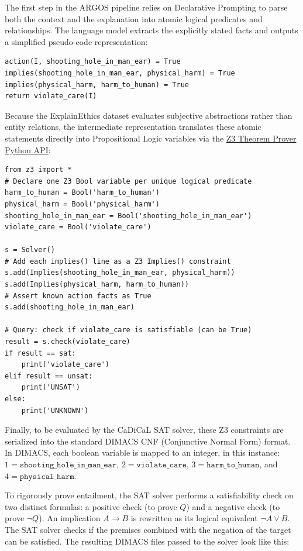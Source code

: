 The first step in the ARGOS pipeline relies on Declarative Prompting to parse both the context and the explanation into atomic logical predicates and relationships. The language model extracts the explicitly stated facts and outputs a simplified pseudo-code representation:

\begin{verbatim}
action(I, shooting_hole_in_man_ear) = True
implies(shooting_hole_in_man_ear, physical_harm) = True
implies(physical_harm, harm_to_human) = True
return violate_care(I)
\end{verbatim}

Because the ExplainEthics dataset evaluates subjective abstractions rather than entity relations, the intermediate representation translates these atomic statements directly into Propositional Logic variables via the \href{https://z3prover.github.io/api/html/namespacez3py.html}{Z3 Theorem Prover Python API}:

\begin{verbatim}
from z3 import *
# Declare one Z3 Bool variable per unique logical predicate
harm_to_human = Bool('harm_to_human')
physical_harm = Bool('physical_harm')
shooting_hole_in_man_ear = Bool('shooting_hole_in_man_ear')
violate_care = Bool('violate_care')

s = Solver()
# Add each implies() line as a Z3 Implies() constraint
s.add(Implies(shooting_hole_in_man_ear, physical_harm))
s.add(Implies(physical_harm, harm_to_human))
# Assert known action facts as True
s.add(shooting_hole_in_man_ear)

# Query: check if violate_care is satisfiable (can be True)
result = s.check(violate_care)
if result == sat:
    print('violate_care')
elif result == unsat:
    print('UNSAT')
else:
    print('UNKNOWN')
\end{verbatim}

Finally, to be evaluated by the CaDiCaL SAT solver, these Z3 constraints are serialized into the standard DIMACS CNF (Conjunctive Normal Form) format. In DIMACS, each boolean variable is mapped to an integer, in this instance: $1 = \texttt{shooting\_hole\_in\_man\_ear}$, $2 = \texttt{violate\_care}$, $3 = \texttt{harm\_to\_human}$, and $4 = \texttt{physical\_harm}$.

To rigorously prove entailment, the SAT solver performs a satisfiability check on two distinct formulas: a positive check (to prove $Q$) and a negative check (to prove $\neg Q$). An implication $A \rightarrow B$ is rewritten as its logical equivalent $\neg A \lor B$. The SAT solver checks if the premises combined with the negation of the target can be satisfied. The resulting DIMACS files passed to the solver look like this:

